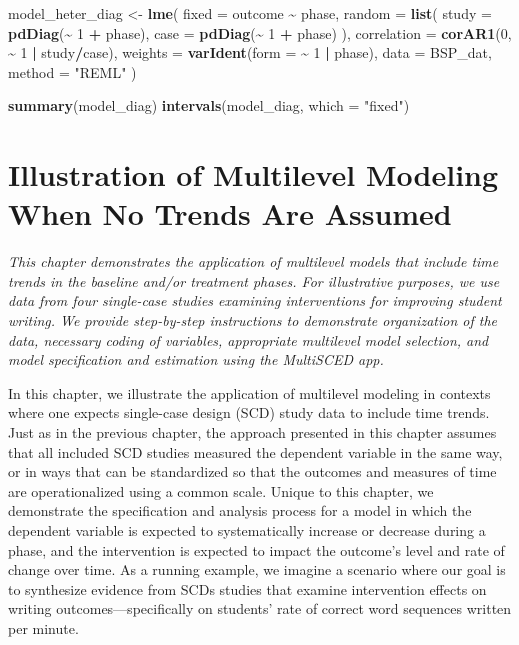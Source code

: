 \documentclass[
]{book}
\newenvironment{Shaded}{\begin{snugshade}}{\end{snugshade}}
\newcommand{\AttributeTok}[1]{\textcolor[rgb]{0.13,0.29,0.53}{#1}}
\newcommand{\DecValTok}[1]{\textcolor[rgb]{0.00,0.00,0.81}{#1}}
\newcommand{\FunctionTok}[1]{\textcolor[rgb]{0.13,0.29,0.53}{\textbf{#1}}}
\newcommand{\NormalTok}[1]{#1}
\newcommand{\OtherTok}[1]{\textcolor[rgb]{0.56,0.35,0.01}{#1}}
\newcommand{\SpecialCharTok}[1]{\textcolor[rgb]{0.81,0.36,0.00}{\textbf{#1}}}
\newcommand{\StringTok}[1]{\textcolor[rgb]{0.31,0.60,0.02}{#1}}
\begin{document}
\begin{Shaded}
\begin{Highlighting}[]
\NormalTok{model\_heter\_diag }\OtherTok{\textless{}{-}} 
  \FunctionTok{lme}\NormalTok{(}
    \AttributeTok{fixed =}\NormalTok{ outcome }\SpecialCharTok{\textasciitilde{}}\NormalTok{ phase, }
    \AttributeTok{random =} \FunctionTok{list}\NormalTok{(}
      \AttributeTok{study =} \FunctionTok{pdDiag}\NormalTok{(}\SpecialCharTok{\textasciitilde{}} \DecValTok{1} \SpecialCharTok{+}\NormalTok{ phase),}
      \AttributeTok{case =} \FunctionTok{pdDiag}\NormalTok{(}\SpecialCharTok{\textasciitilde{}} \DecValTok{1} \SpecialCharTok{+}\NormalTok{ phase)}
\NormalTok{    ),}
    \AttributeTok{correlation =} \FunctionTok{corAR1}\NormalTok{(}\DecValTok{0}\NormalTok{, }\SpecialCharTok{\textasciitilde{}} \DecValTok{1} \SpecialCharTok{|}\NormalTok{ study}\SpecialCharTok{/}\NormalTok{case),}
    \AttributeTok{weights =} \FunctionTok{varIdent}\NormalTok{(}\AttributeTok{form =} \SpecialCharTok{\textasciitilde{}} \DecValTok{1} \SpecialCharTok{|}\NormalTok{ phase),}
    \AttributeTok{data =}\NormalTok{ BSP\_dat,}
    \AttributeTok{method =} \StringTok{"REML"}
\NormalTok{  ) }

\FunctionTok{summary}\NormalTok{(model\_diag)}
\FunctionTok{intervals}\NormalTok{(model\_diag, }\AttributeTok{which =} \StringTok{"fixed"}\NormalTok{)}
\end{Highlighting}
\end{Shaded}

\hypertarget{MLM-Trend}{%
\chapter{Illustration of Multilevel Modeling When No Trends Are Assumed}\label{MLM-Trend}}

\emph{This chapter demonstrates the application of multilevel models that include time trends in the baseline and/or treatment phases. For illustrative purposes, we use data from four single-case studies examining interventions for improving student writing. We provide step-by-step instructions to demonstrate organization of the data, necessary coding of variables, appropriate multilevel model selection, and model specification and estimation using the MultiSCED app.}

In this chapter, we illustrate the application of multilevel modeling in contexts where one expects single-case design (SCD) study data to include time trends. Just as in the previous chapter, the approach presented in this chapter assumes that all included SCD studies measured the dependent variable in the same way, or in ways that can be standardized so that the outcomes and measures of time are operationalized using a common scale. Unique to this chapter, we demonstrate the specification and analysis process for a model in which the dependent variable is expected to systematically increase or decrease during a phase, and the intervention is expected to impact the outcome's level and rate of change over time. As a running example, we imagine a scenario where our goal is to synthesize evidence from SCDs studies that examine intervention effects on writing outcomes---specifically on students' rate of correct word sequences written per minute.
\end{document}
